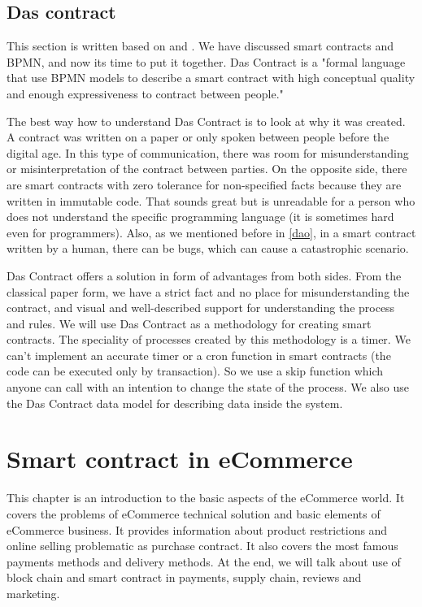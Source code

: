 \documentclass[thesis=M,english]{FITthesis}[2019/12/23]
\begin{document}


\section{Das contract}
This section is written based on \cite{dasContract} and \cite{newDasContract}.
We have discussed smart contracts and BPMN, and now its time to put it together. Das Contract is a "formal language that use BPMN models to describe a smart contract with high conceptual quality and enough expressiveness to contract between people."\cite{dasContract}

The best way how to understand Das Contract is to look at why it was created. A contract was written on a paper or only spoken between people before the digital age. In this type of communication, there was room for misunderstanding or misinterpretation of the contract between parties. On the opposite side, there are smart contracts with zero tolerance for non-specified facts because they are written in immutable code. That sounds great but is unreadable for a person who does not understand the specific programming language (it is sometimes hard even for programmers). Also, as we mentioned before in \ref{dao}, in a smart contract written by a human, there can be bugs, which can cause a catastrophic scenario.

Das Contract offers a solution in form of advantages from both sides. From the classical paper form, we have a strict fact and no place for misunderstanding the contract, and visual and well-described support for understanding the process and rules.
We will use Das Contract as a methodology for creating smart contracts. The speciality of processes created by this methodology is a timer. We can't implement an accurate timer or a cron function in smart contracts (the code can be executed only by transaction). So we use a skip function which anyone can call with an intention to change the state of the process. We also use the Das Contract data model for describing data inside the system.


\chapter{Smart contract in eCommerce}

This chapter is an introduction to the basic aspects of the eCommerce world. It covers the problems of eCommerce technical solution and basic elements of eCommerce business. It provides information about product restrictions and online selling problematic as purchase contract. It also covers the most famous payments methods and delivery methods. At the end, we will talk about use of block chain and smart contract in payments, supply chain, reviews and marketing.
\end{document}
